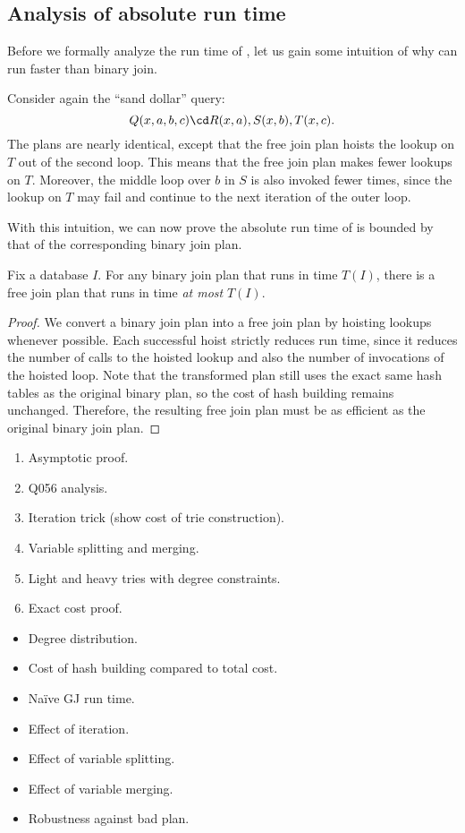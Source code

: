 \subsection{Analysis of absolute run time}
Before we formally analyze the run time of \FJ,
  let us gain some intuition of why \FJ can run faster than binary join.
\begin{example}
  Consider again the ``sand dollar'' query: 
%
  $$Q(x, a, b, c) \cd R(x, a), S(x, b), T(x, c).$$
%
  The plans are nearly identical, 
   except that the free join plan hoists the lookup on $T$ out of the second loop.
  This means that the free join plan makes fewer lookups on $T$.
  Moreover, the middle loop over $b$ in $S$ is also invoked fewer times, 
   since the lookup on $T$ may fail and continue to the next iteration of the outer loop.
\end{example}

With this intuition, we can now prove the absolute run time of \FJ
  is bounded by that of the corresponding binary join plan.

\begin{theorem}
  Fix a database $I$. 
  For any binary join plan that runs in time $T(I)$,
   there is a free join plan that runs in time \emph{at most} $T(I)$.
\end{theorem}
%
\begin{proof}
  We convert a binary join plan into a free join plan 
    by hoisting lookups whenever possible.
  Each successful hoist strictly reduces run time, 
    since it reduces the number of calls to the hoisted lookup
    and also the number of invocations of the hoisted loop.
  Note that the transformed plan still uses the exact same hash tables
    as the original binary plan, 
    so the cost of hash building remains unchanged.
  Therefore, the resulting free join plan must be as efficient 
    as the original binary join plan.
\end{proof}

\begin{enumerate}
  \item Asymptotic proof.
  \item Q056 analysis.
  \item Iteration trick (show cost of trie construction).
  \item Variable splitting and merging.
  \item Light and heavy tries with degree constraints.
  \item Exact cost proof.
\end{enumerate}

\begin{itemize}
  \item Degree distribution.
  \item Cost of hash building compared to total cost.
  \item Na\"ive GJ run time.
  \item Effect of iteration.
  \item Effect of variable splitting.
  \item Effect of variable merging.
  \item Robustness against bad plan.
\end{itemize}